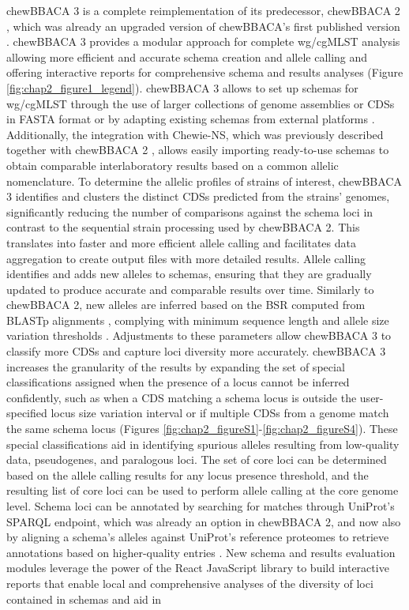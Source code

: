 chewBBACA 3 is a complete reimplementation of its predecessor, chewBBACA 2 \citep{mamede_chewie_2021}, which was already an upgraded version of chewBBACA’s first published version \citep{silva_chewbbaca_2018}. chewBBACA 3 provides a modular approach for complete \ac{wg/cgMLST} analysis allowing more efficient and accurate schema creation and allele calling and offering interactive reports for comprehensive schema and results analyses (Figure \ref{fig:chap2_figure1_legend}). chewBBACA 3 allows to set up schemas for \ac{wg/cgMLST} through the use of larger collections of genome assemblies or \ac{CDSs} in FASTA format or by adapting existing schemas from external platforms \citep{jolley_bigsdb_2010, zhou_enterobase_2020, noauthor_cgmlstorg_nodate}. Additionally, the integration with Chewie-NS, which was previously described together with chewBBACA 2 \citep{mamede_chewie_2021}, allows easily importing ready-to-use schemas to obtain comparable interlaboratory results based on a common allelic nomenclature. To determine the allelic profiles of strains of interest, chewBBACA 3 identifies and clusters the distinct CDSs predicted from the strains' genomes, significantly reducing the number of comparisons against the schema loci in contrast to the sequential strain processing used by chewBBACA 2. This translates into faster and more efficient allele calling and facilitates data aggregation to create output files with more detailed results. Allele calling identifies and adds new alleles to schemas, ensuring that they are gradually updated to produce accurate and comparable results over time. Similarly to chewBBACA 2, new alleles are inferred based on the \ac{BSR} \citep{rasko_visualization_2005} computed from \ac{BLASTp} alignments \citep{camacho_blast_2009}, complying with minimum sequence length and allele size variation thresholds \citep{silva_chewbbaca_2018}. Adjustments to these parameters allow chewBBACA 3 to classify more \ac{CDSs} and capture loci diversity more accurately. chewBBACA 3 increases the granularity of the results by expanding the set of special classifications assigned when the presence of a locus cannot be inferred confidently, such as when a \ac{CDS} matching a schema locus is outside the user-specified locus size variation interval or if multiple \ac{CDSs} from a genome match the same schema locus (Figures \ref{fig:chap2_figureS1}-\ref{fig:chap2_figureS4}). These special classifications aid in identifying spurious alleles resulting from low-quality data, pseudogenes, and paralogous loci. The set of core loci can be determined based on the allele calling results for any locus presence threshold, and the resulting list of core loci can be used to perform allele calling at the core genome level. Schema loci can be annotated by searching for matches through UniProt’s \ac{SPARQL} endpoint, which was already an option in chewBBACA 2, and now also by aligning a schema’s alleles against UniProt’s reference proteomes to retrieve annotations based on higher-quality entries \citep{the_uniprot_consortium_uniprot_2025}. New schema and results evaluation modules leverage the power of the React JavaScript library \citep{noauthor_react_nodate} to build interactive reports that enable local and comprehensive analyses of the diversity of loci contained in schemas and aid in 